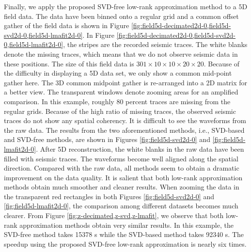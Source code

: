 Finally, we apply the proposed SVD-free low-rank approximation method to a 5D field data. The data have been binned onto a regular grid and a common offset gather of the field data is shown in Figure \ref{fig:field5d-decimated2d-0,field5d-svd2d-0,field5d-lmafit2d-0}. In Figure \ref{fig:field5d-decimated2d-0,field5d-svd2d-0,field5d-lmafit2d-0}, the  stripes are the recorded seismic traces. The white blanks denote the missing traces, which means that we do not observe seismic data in these positions. The size of this field data is $301\times10\times10\times20\times20$. Because of the difficulty in displaying a 5D data set, we only show a common mid-point gather here. The 3D common midpoint gather is re-arranged into a 2D matrix for a better view. The transparent  windows denote zooming areas for an amplified comparison. In this example, roughly 80 percent traces are missing from the regular grids. Because of the high ratio of missing traces, the observed seismic traces do not show any spatial coherency. It is difficult to see the waveforms from the raw data. The results from the two aforementioned methods, i.e., SVD-based and SVD-free methods, are shown in Figures \ref{fig:field5d-svd2d-0} and \ref{fig:field5d-lmafit2d-0}. After 5D reconstruction, the white blanks in the raw data have been filled with seismic traces. The waveforms become well aligned along the spatial direction. Compared with the raw data, all methods seem to obtain a dramatic improvement on the data quality. It is salient that both low-rank approximation methods obtain much smoother and cleaner results.  When zooming the data in the transparent red rectangles in both Figures \ref{fig:field5d-svd2d-0} and \ref{fig:field5d-lmafit2d-0}, the comparison among different datasets becomes much clearer. From Figure \ref{fig:z-decimated,z-svd,z-lmafit}, we observe that both low-rank approximation methods obtain very similar results. In this example, the SVD-free method takes 15378 s while the SVD-based method takes 92340 s. The speedup using the proposed SVD-free low-rank approximation is nearly six times. 


